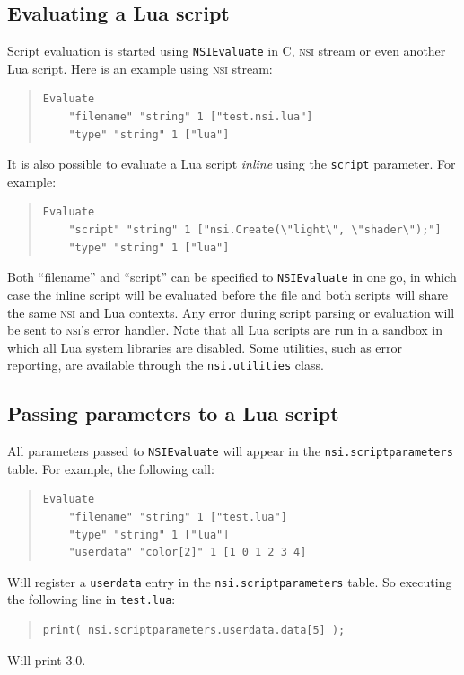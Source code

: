 \documentclass[oneside,ebook]{memoir}
\newcommand*{\acronym}[1]{\textsc{\lowercase{#1}}}
\begin{document}
\subsection{Evaluating a Lua script}
\label{subsection:luaevaluation}
Script evaluation is started using \hyperref[CAPI:nsievaluate]{\lstinline|NSIEvaluate|} in C, \acronym{NSI} stream or even another Lua script.
Here is an example using \acronym{NSI} stream:
\begin{quote}
\begin{lstlisting}
Evaluate
	"filename" "string" 1 ["test.nsi.lua"]
	"type" "string" 1 ["lua"]
\end{lstlisting}
\end{quote}
It is also possible to evaluate a Lua script \emph{inline} using the \lstinline|script| parameter. For example:
\begin{quote}
\begin{lstlisting}
Evaluate
	"script" "string" 1 ["nsi.Create(\"light\", \"shader\");"]
	"type" "string" 1 ["lua"]
\end{lstlisting}
\end{quote}
Both ``filename'' and ``script'' can be specified to \lstinline|NSIEvaluate| in one go, in which case the inline script will be evaluated before the file and both scripts will share the same \acronym{NSI} and Lua contexts.
Any error during script parsing or evaluation will be sent to \acronym{NSI}'s error handler.
Note that all Lua scripts are run in a sandbox in which all Lua system libraries are disabled.
Some utilities, such as error reporting, are available through the \lstinline|nsi.utilities| class.

\subsection{Passing parameters to a Lua script}
All parameters passed to \lstinline|NSIEvaluate| will appear in the \lstinline|nsi.scriptparameters| table. For example, the following call:
\begin{quote}
\begin{lstlisting}
Evaluate
	"filename" "string" 1 ["test.lua"]
	"type" "string" 1 ["lua"]
	"userdata" "color[2]" 1 [1 0 1 2 3 4]
\end{lstlisting}
\end{quote}
Will register a \lstinline|userdata| entry in the \lstinline|nsi.scriptparameters| table. So executing the following line in \lstinline|test.lua|:
\begin{quote}
\begin{lstlisting}
print( nsi.scriptparameters.userdata.data[5] );
\end{lstlisting}
\end{quote}
Will print 3.0.
\end{document}
